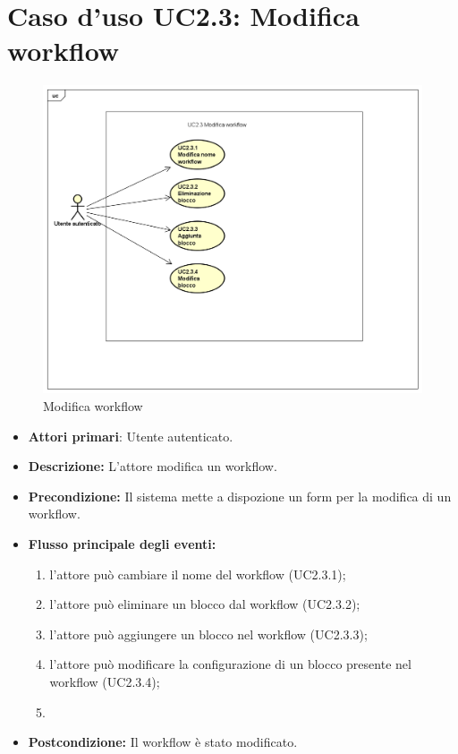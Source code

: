		\section{Caso d'uso UC2.3: Modifica workflow}
		\begin{figure} [h]
			\centering
			\includegraphics[scale=0.4]{./Diagram/UC2-3.png}
			\caption{Modifica workflow }\label{}
		\end{figure}
		\begin{itemize}
			\item \textbf{Attori primari}: Utente autenticato.
			\item \textbf{Descrizione:} L'attore modifica un workflow.
			\item \textbf{Precondizione:} Il sistema mette a dispozione un form per la modifica di un workflow.
			\item \textbf{Flusso principale degli eventi:}
			\begin{enumerate}
				\item l'attore può cambiare il nome del workflow (UC2.3.1);
				\item l'attore può eliminare un blocco dal workflow (UC2.3.2);
				\item l'attore può aggiungere un blocco nel workflow (UC2.3.3);
				\item l'attore può modificare la configurazione di un blocco presente nel workflow (UC2.3.4);
				\item 
			\end{enumerate}
			\item \textbf{Postcondizione:} Il workflow è stato modificato.
		\end{itemize}
